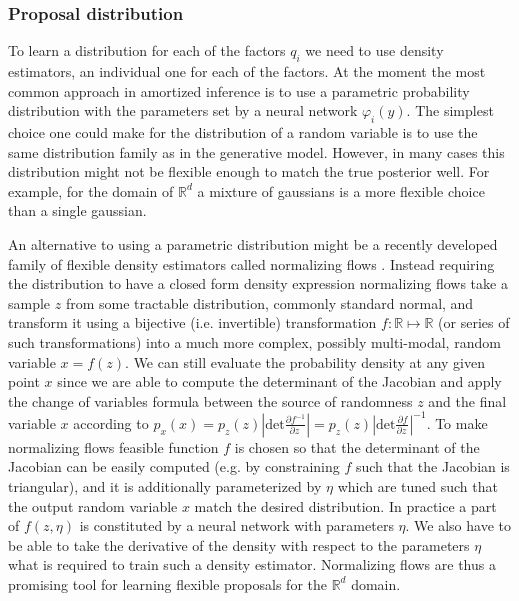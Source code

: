 \documentclass[12pt]{article}
\begin{document}




\subsubsection*{Proposal distribution}

To learn a distribution for each of the factors $q_i$ we need to use density estimators, an individual one for each of the factors.
At the moment the most common approach in amortized inference is to use a parametric probability distribution with the parameters set by a neural network $\varphi_i(y)$.
The simplest choice one could make for the distribution of a random variable is to use the same distribution family as in the generative model.
However, in many cases this distribution might not be flexible enough to match the true posterior well.
For example, for the domain of $\mathbb{R}^d$ a mixture of gaussians is a more flexible choice than a single gaussian.

An alternative to using a parametric distribution might be a recently developed family of flexible density estimators called normalizing flows \citep{RezendeMohamed2015,IAF,MAF}.
Instead requiring the distribution to have a closed form density expression normalizing flows take a sample $z$ from some tractable distribution, commonly standard normal, and transform it using a bijective (i.e. invertible) transformation $f: \mathbb{R} \mapsto \mathbb{R}$ (or series of such transformations) into a much more complex, possibly multi-modal, random variable $x=f(z)$.
We can still evaluate the probability density at any given point $x$ since we are able to compute the determinant of the Jacobian and apply the change of variables formula between the source of randomness $z$ and the final variable $x$ according to 
$p_x(x) = p_z(z) \left|
    \mathrm{det} \frac{
      \partial f^{-1}
    }{
      \partial z\
    }
  \right|
  = p_z(z) \left|
    \mathrm{det} \frac{
      \partial f
    }{
      \partial z\
    }
  \right| ^{-1}$.
To make normalizing flows feasible function $f$ is chosen so that the determinant of the Jacobian can be easily computed (e.g. by constraining $f$ such that the Jacobian is triangular), and it is additionally parameterized by $\eta$ which are tuned such that the output random variable $x$ match the desired distribution. In practice a part of $f(z, \eta)$ is constituted by a neural network with parameters $\eta$.
We also have to be able to take the derivative of the density with respect to the parameters $\eta$ what is required to train such a density estimator.
Normalizing flows are thus a promising tool for learning flexible proposals for the $\mathbb{R}^d$ domain.
\end{document}
